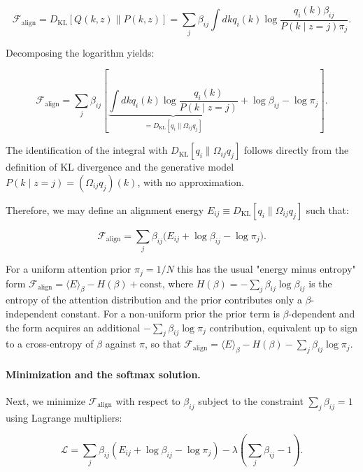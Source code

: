 \documentclass[11pt]{article}
\begin{document}
\begin{equation}
\mathcal{F}_{\text{align}} = D_{\mathrm{KL}}[Q(k,z) \| P(k,z)] = \sum_j \beta_{ij} \int dk q_i(k) \log \frac{q_i(k) \beta_{ij}}{P(k \mid z{=}j) \pi_j}.
\end{equation}

Decomposing the logarithm yields:

\begin{equation}
\mathcal{F}_{\text{align}} = \sum_j \beta_{ij} \left[ \underbrace{\int dk q_i(k) \log \frac{q_i(k)}{P(k \mid z{=}j)}}_{=  D_{\mathrm{KL}}[q_i \| \Omega_{ij} q_j]} + \log \beta_{ij} - \log \pi_j \right].
\label{eq:mixture_free_energy}
\end{equation}

The identification of the integral with $D_{\mathrm{KL}}[q_i \| \Omega_{ij} q_j]$ follows directly from the definition of KL divergence and the generative model $P(k \mid z{=}j) = (\Omega_{ij} q_j)(k)$, with no approximation.

Therefore, we may define an alignment energy $E_{ij} \equiv D_{\mathrm{KL}}[q_i \| \Omega_{ij} q_j]$ such that:

\begin{equation}
\mathcal{F}_{\text{align}} = \sum_j \beta_{ij} \big( E_{ij} + \log \beta_{ij} - \log \pi_j \big).
\label{eq:mixture_energy_entropy}
\end{equation}

For a uniform attention prior $\pi_j = 1/N$ this has the usual "energy minus entropy" form $\mathcal{F}_{\text{align}} = \langle E \rangle_\beta - H(\beta) + \text{const}$, where $H(\beta) = -\sum_j \beta_{ij} \log \beta_{ij}$ is the entropy of the attention distribution and the prior contributes only a $\beta$-independent constant. For a non-uniform prior the prior term is $\beta$-dependent and the form acquires an additional $-\sum_j \beta_{ij} \log \pi_j$ contribution, equivalent up to sign to a cross-entropy of $\beta$ against $\pi$, so that $\mathcal{F}_{\text{align}} = \langle E \rangle_\beta - H(\beta) - \sum_j \beta_{ij} \log \pi_j$.

\paragraph{Minimization and the softmax solution.}
Next, we minimize $\mathcal{F}_{\text{align}}$ with respect to $\beta_{ij}$ subject to the constraint $\sum_j \beta_{ij} = 1$ using Lagrange multipliers:

\begin{equation}
\mathcal{L} = \sum_j \beta_{ij}(E_{ij} + \log \beta_{ij} - \log \pi_j) - \lambda\left(\sum_j \beta_{ij} - 1\right).
\end{equation}
\end{document}
